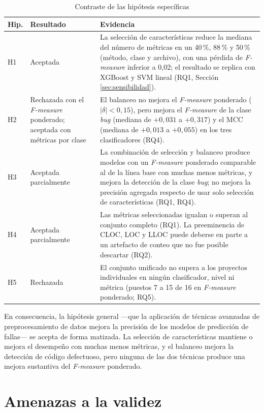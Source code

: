 \begin{table}[H]
\centering
\caption{Contraste de las hipótesis específicas}
\label{tab:hipotesis}
\small
\begin{tabular}{p{0.9cm}p{2.6cm}p{10.2cm}}
\toprule
Hip. & Resultado & Evidencia \\
\midrule
H1 & Aceptada & La selección de características reduce la mediana del número de métricas en un 40\,\%, 88\,\% y 50\,\% (método, clase y archivo), con una pérdida de \textit{F-measure} inferior a 0,02; el resultado se replica con XGBoost y SVM lineal (RQ1, Sección \ref{sec:sensibilidad}). \\
H2 & Rechazada con el \textit{F-measure} ponderado; aceptada con métricas por clase & El balanceo no mejora el \textit{F-measure} ponderado ($|\delta| < 0{,}15$), pero mejora el \textit{F-measure} de la clase \textit{bug} (mediana de $+0{,}031$ a $+0{,}317$) y el MCC (mediana de $+0{,}013$ a $+0{,}055$) en los tres clasificadores (RQ4). \\
H3 & Aceptada parcialmente & La combinación de selección y balanceo produce modelos con un \textit{F-measure} ponderado comparable al de la línea base con muchas menos métricas, y mejora la detección de la clase \textit{bug}; no mejora la precisión agregada respecto de usar solo selección de características (RQ1, RQ4). \\
H4 & Aceptada parcialmente & Las métricas seleccionadas igualan o superan al conjunto completo (RQ1). La preeminencia de CLOC, LOC y LLOC puede deberse en parte a un artefacto de conteo que no fue posible descartar (RQ2). \\
H5 & Rechazada & El conjunto unificado no supera a los proyectos individuales en ningún clasificador, nivel ni métrica (puestos 7 a 15 de 16 en \textit{F-measure} ponderado; RQ5). \\
\bottomrule
\end{tabular}
\end{table}

En consecuencia, la hipótesis general ---que la aplicación de técnicas avanzadas de preprocesamiento de datos mejora la precisión de los modelos de predicción de fallas--- se acepta de forma matizada. La selección de características mantiene o mejora el desempeño con muchas menos métricas, y el balanceo mejora la detección de código defectuoso, pero ninguna de las dos técnicas produce una mejora sustantiva del \textit{F-measure} ponderado.

\section{Amenazas a la validez}

